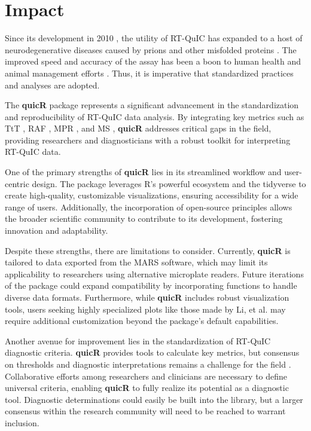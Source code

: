 \documentclass[preprint,12pt,a4paper]{elsarticle}
\begin{document}
    \section{Impact}
        Since its development in 2010 \cite{Wilham2010,Atarashi2011}, the utility of RT-QuIC has expanded to a host of neurodegenerative diseases caused by prions and other misfolded proteins \cite{Orru2024,ALWAKIL202597,Wang2024}. The improved speed and accuracy of the assay has been a boon to human health \cite{Orru2015,green2019rt,race2019transmission,vascellari2022real} and animal management efforts \cite{huang2025chronic,cooper2019detection,piel2024validation,harpaz2024transmission}. Thus, it is imperative that standardized practices and analyses are adopted.

        The \textbf{quicR} package represents a significant advancement in the standardization and reproducibility of RT-QuIC data analysis. By integrating key metrics such as TtT \cite{Orru2015}, RAF \cite{Gallups2022}, MPR \cite{Rowden2023}, and MS \cite{Henderson2015}, \textbf{quicR} addresses critical gaps in the field, providing researchers and diagnosticians with a robust toolkit for interpreting RT-QuIC data.

        One of the primary strengths of \textbf{quicR} lies in its streamlined workflow and user-centric design. The package leverages R’s powerful ecosystem and the tidyverse \cite{tidyverse2019} to create high-quality, customizable visualizations, ensuring accessibility for a wide range of users. Additionally, the incorporation of open-source principles allows the broader scientific community to contribute to its development, fostering innovation and adaptability.

        Despite these strengths, there are limitations to consider. Currently, \textbf{quicR} is tailored to data exported from the MARS software, which may limit its applicability to researchers using alternative microplate readers. Future iterations of the package could expand compatibility by incorporating functions to handle diverse data formats. Furthermore, while \textbf{quicR} includes robust visualization tools, users seeking highly specialized plots like those made by Li, et al.\cite{Li2025} may require additional customization beyond the package’s default capabilities.

        Another avenue for improvement lies in the standardization of RT-QuIC diagnostic criteria. \textbf{quicR} provides tools to calculate key metrics, but consensus on thresholds and diagnostic interpretations remains a challenge for the field \cite{Rowden2023}. Collaborative efforts among researchers and clinicians are necessary to define universal criteria, enabling \textbf{quicR} to fully realize its potential as a diagnostic tool. Diagnostic determinations could easily be built into the library, but a larger consensus within the research community will need to be reached to warrant inclusion.
\end{document}
